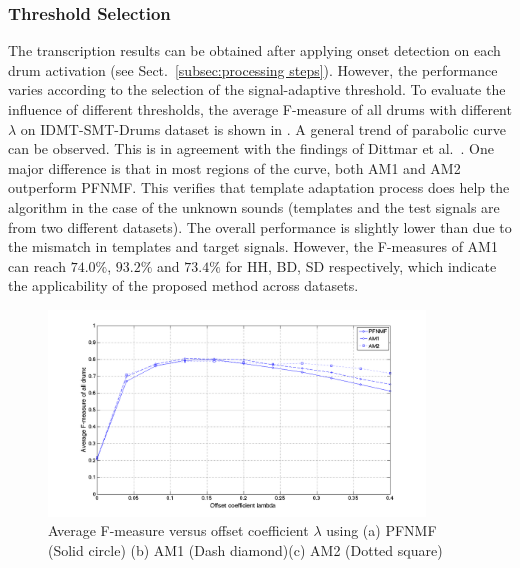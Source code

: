 \documentclass{article}
\begin{document}
\subsubsection{Threshold Selection}\label{subsec:threshold}
The transcription results can be obtained after applying onset detection on each drum activation (see Sect.~\ref{subsec:processing steps}). However, the performance varies according to the selection of the signal-adaptive threshold. To evaluate the influence of different thresholds, the average F-measure of all drums with different $\lambda$ on IDMT-SMT-Drums dataset is shown in . A general trend of parabolic curve can be observed. This is in agreement with the findings of Dittmar et al.\ \cite{Dittmar2014}. One major difference is that in most regions of the curve, both AM1 and AM2 outperform PFNMF. This verifies that template adaptation process does help the algorithm in the case of the unknown sounds (templates and the test signals are from two different datasets). The overall performance is slightly lower than \cite{Dittmar2014} due to the mismatch in templates and target signals. However, the F-measures of AM1 can reach $74.0\%$, $93.2\%$ and $73.4\%$ for HH, BD, SD respectively, which indicate the applicability of the proposed method across datasets. 

\begin{figure}
 \centerline{
 \includegraphics[width=10cm]{thresSelect.png}}
 \caption{Average F-measure versus offset coefficient $\lambda$ using (a) PFNMF (Solid circle) (b) AM1 (Dash diamond)(c) AM2 (Dotted square)}%
 \label{fig:thresTest}
\end{figure}
\end{document}
